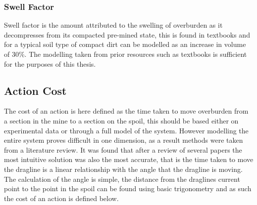\subsubsection{Swell Factor}
Swell factor is the amount attributed to the swelling of overburden as it decompresses from its compacted pre-mined state, this is found in textbooks and for a typical soil type of compact dirt can be modelled as an increase in volume of 30\%. The modelling taken from prior resources such as textbooks is sufficient for the purposes of this thesis.

	

\subsection{Action Cost}
The cost of an action is here defined as the time taken to move overburden from a section in the mine to a section on the spoil, this should be based either on experimental data or through a full model of the system. However modelling the entire system proves difficult in one dimension, as a result methods were taken from a literature review. It was found that after a review of several papers the most intuitive solution was also the most accurate, that is the time taken to move the dragline is a linear relationship with the angle that the dragline is moving. \\The calculation of the angle is simple, the distance from the draglines current point to the point in the spoil can be found using basic trigonometry and as such the cost of an action is defined below. 

